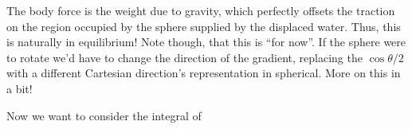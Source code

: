 The body force is the weight due to gravity, which perfectly offsets the traction on the region occupied by the sphere supplied by the displaced water. 
Thus, this is naturally in equilibrium!
Note though, that this is ``for now''. 
If the sphere were to rotate we'd have to change the direction of the gradient, replacing the $\cos\theta/2$ with a different Cartesian direction's representation in spherical. 
More on this in a bit!

Now we want to consider the integral of 


